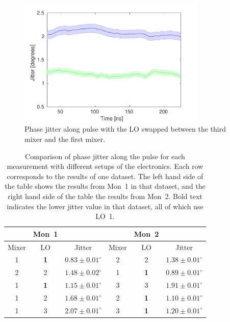 \begin{figure}
  \centering
  \includegraphics[width=0.8\textwidth]{Figures/phaseMons/Mix1Mon1PhShft3_Mix3Mon2PhShft1}
  \caption{Phase jitter along pulse with the LO swapped between the third mixer and the first mixer.}
  \label{f:Mix1Mon1PhShft3_Mix3Mon2PhShft1}
\end{figure}

\begin{table}
  \begin{center}
    \begin{tabular}{|c c c | c c c|}
	   \hline
	   & Mon~1 & & & Mon~2 & \\ \hline
      Mixer & LO & Jitter & Mixer & LO & Jitter \\ \hline
      1 & \textbf{1} & \(\mathbf{0.83\pm0.01^\circ}\) & 2 & 2 & \(1.38\pm0.01^\circ\)    \\
      2 & 2 & \(1.48\pm0.02^\circ\) & 1 & \textbf{1} & \(\mathbf{0.89\pm0.01^\circ}\)    \\ 
      1 & \textbf{1} & \(\mathbf{1.15\pm0.01^\circ}\) & 3 & 3 & \(1.91\pm0.01^\circ\)    \\ 
      1 & 2 & \(1.68\pm0.01^\circ\) & 2 & \textbf{1} & \(\mathbf{1.10\pm0.01^\circ}\)    \\ 
      1 & 3 & \(2.07\pm0.01^\circ\) & 3 & \textbf{1} & \(\mathbf{1.20\pm0.01^\circ}\)    \\  
	\hline
    \end{tabular}
    \caption{Comparison of phase jitter along the pulse for each measurement with different setups of the electronics. Each row corresponds to the results of one dataset. The left hand side of the table shows the results from Mon~1 in that dataset, and the right hand side of the table the results from Mon~2. Bold text indicates the lower jitter value in that dataset, all of which use LO~1.}
  	\label{t:elecSwapResults}
  \end{center}
\end{table}

